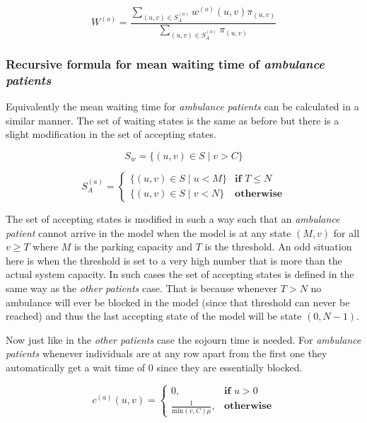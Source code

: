 \begin{equation} \label{eq:recursive-waiting-time-others}
    W^{(o)} = \frac{\sum_{(u,v) \in S_A^{(o)}} w^{(o)}(u,v) \pi_{(u,v)}}{\sum_{(u,v) \in S_A^{(o)}} \pi_{(u,v)}}
\end{equation}



\subsubsection{Recursive formula for mean waiting time of 
\textit{ambulance patients}} \label{recursive-waiting-time-ambulance}

Equivalently the mean waiting time for \textit{ambulance patients} can be calculated 
in a similar manner. 
The set of waiting states is the same as before but there is a slight modification 
in the set of accepting states.

\[
    S_w = \{(u, v) \in S \; | \; v > C \}    
\]

\begin{equation}\label{eq:accepting_states_ambulance}
    S_A^{(a)}=
    \begin{cases}
        \{(u, v) \in S \; | \; u < M \} & \textbf{if } T \leq N\\
        \{(u, v) \in S \; | \; v < N \} & \textbf{otherwise}
    \end{cases}
\end{equation}

The set of accepting states is modified in such a way such that an \textit{ambulance 
patient} cannot arrive in the model when the model is at any state \((M, v)\) for 
all \(v \geq T\) where \(M\) is the parking capacity and \(T\) is the threshold. 
An odd situation here is when the threshold is set to a very high number that is 
more than the actual system capacity. 
In such cases the set of accepting states is defined in the same way as the 
\textit{other patients} case. 
That is because whenever \(T > N\) no ambulance will ever be blocked in the model 
(since that threshold can never be reached) and thus the last accepting state of 
the model will be state \( (0,N-1)\). 

Now just like in the \textit{other patients} case the sojourn time is needed. 
For \textit{ambulance patients} whenever individuals are at any row apart from the 
first one they automatically get a wait time of \(0\) since they are essentially 
blocked.

\begin{equation} \label{eq:sojourn_ambulance}
    c^{(a)}(u,v) = 
    \begin{cases}
        0, & \textbf{if } u > 0 \\
        \frac{1}{\text{min}(v,C)\mu}, & \textbf{otherwise}
    \end{cases}
\end{equation}

